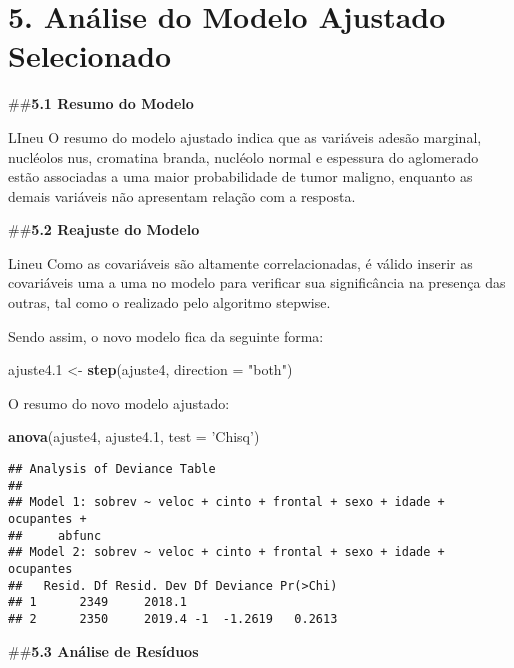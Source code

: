 \documentclass[
]{article}
\newenvironment{Shaded}{\begin{snugshade}}{\end{snugshade}}
\newcommand{\DataTypeTok}[1]{\textcolor[rgb]{0.13,0.29,0.53}{#1}}
\newcommand{\FloatTok}[1]{\textcolor[rgb]{0.00,0.00,0.81}{#1}}
\newcommand{\KeywordTok}[1]{\textcolor[rgb]{0.13,0.29,0.53}{\textbf{#1}}}
\newcommand{\NormalTok}[1]{#1}
\newcommand{\StringTok}[1]{\textcolor[rgb]{0.31,0.60,0.02}{#1}}
\begin{document}
\hypertarget{anuxe1lise-do-modelo-ajustado-selecionado}{%
\section{5. Análise do Modelo Ajustado
Selecionado}\label{anuxe1lise-do-modelo-ajustado-selecionado}}

\#\#\textbf{5.1 Resumo do Modelo}

LIneu O resumo do modelo ajustado indica que as variáveis adesão
marginal, nucléolos nus, cromatina branda, nucléolo normal e espessura
do aglomerado estão associadas a uma maior probabilidade de tumor
maligno, enquanto as demais variáveis não apresentam relação com a
resposta.

\#\#\textbf{5.2 Reajuste do Modelo}

Lineu Como as covariáveis são altamente correlacionadas, é válido
inserir as covariáveis uma a uma no modelo para verificar sua
significância na presença das outras, tal como o realizado pelo
algoritmo stepwise.

Sendo assim, o novo modelo fica da seguinte forma:

\begin{Shaded}
\begin{Highlighting}[]
\NormalTok{ajuste4}\FloatTok{.1}\NormalTok{ <-}\StringTok{ }\KeywordTok{step}\NormalTok{(ajuste4, }\DataTypeTok{direction =} \StringTok{"both"}\NormalTok{)}
\end{Highlighting}
\end{Shaded}

O resumo do novo modelo ajustado:

\begin{Shaded}
\begin{Highlighting}[]
\KeywordTok{anova}\NormalTok{(ajuste4, ajuste4}\FloatTok{.1}\NormalTok{, }\DataTypeTok{test =} \StringTok{'Chisq'}\NormalTok{)}
\end{Highlighting}
\end{Shaded}

\begin{verbatim}
## Analysis of Deviance Table
## 
## Model 1: sobrev ~ veloc + cinto + frontal + sexo + idade + ocupantes + 
##     abfunc
## Model 2: sobrev ~ veloc + cinto + frontal + sexo + idade + ocupantes
##   Resid. Df Resid. Dev Df Deviance Pr(>Chi)
## 1      2349     2018.1                     
## 2      2350     2019.4 -1  -1.2619   0.2613
\end{verbatim}

\#\#\textbf{5.3 Análise de Resíduos}
\end{document}
